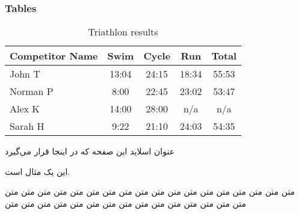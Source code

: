 \begin{frame}
\frametitle{Tables}
\begin{table}
\begin{tabular}{l | c | c | c | c }
Competitor Name & Swim & Cycle & Run & Total \\
\hline \hline
John T & 13:04 & 24:15 & 18:34 & 55:53  \\ 
Norman P & 8:00 & 22:45 & 23:02 & 53:47 \\
Alex K & 14:00 & 28:00 & n/a & n/a \\
Sarah H & 9:22 & 21:10 & 24:03 & 54:35 
\end{tabular}
\caption{Triathlon results}
\end{table}
\end{frame}

\begin{frame}{عنوان اسلاید این صفحه  که در اینجا قرار می‌گیرد}
\begin{example}
این یک مثال است.
\end{example}
\end{frame}

\begin{frame}
\begin{Lemma}
متن متن متن متن متن متن متن متن متن متن متن متن متن متن متن متن متن متن متن متن متن متن متن متن متن متن متن متن متن متن متن متن متن 
\end{Lemma}
\end{frame}


